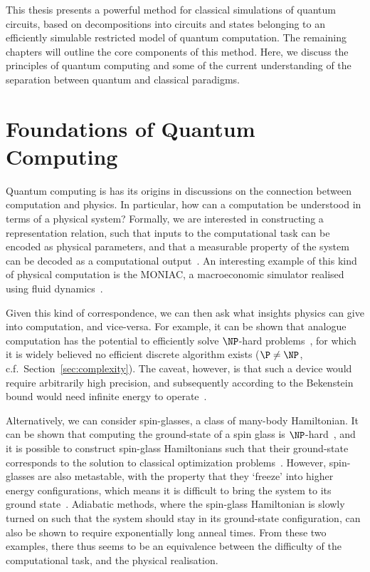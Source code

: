 This thesis presents a powerful method for classical simulations of quantum circuits, based on decompositions into circuits and states belonging to an efficiently simulable restricted model of quantum computation. The remaining chapters will outline the core components of this method. Here, we discuss the principles of quantum computing and some of the current understanding of the separation between quantum and classical paradigms.
\section{Foundations of Quantum Computing}
Quantum computing is has its origins in discussions on the connection between computation and physics. In particular, how can a computation be understood in terms of a physical system? Formally, we are interested in constructing a representation relation, such that inputs to the computational task can be encoded as physical parameters, and that a measurable property of the system can be decoded as a computational output~\cite{Horsman2014}. An interesting example of this kind of physical computation is the MONIAC, a macroeconomic simulator realised using fluid dynamics~\cite{Bissell2007}.\par
Given this kind of correspondence, we can then ask what insights physics can give into computation, and vice-versa. For example, it can be shown that analogue computation has the potential to efficiently solve $\NP$-hard problems~\cite{Schonhage1979}, for which it is widely believed no efficient discrete algorithm exists ($\P \neq \NP$, c.f.\ Section~\ref{sec:complexity}). The caveat, however, is that such a device would require arbitrarily high precision, and subsequently according to the Bekenstein bound would need infinite energy to operate~\cite{Aaronson2005}.\par
Alternatively, we can consider spin-glasses, a class of many-body Hamiltonian. It can be shown that computing the ground-state of a spin glass is $\NP$-hard~\cite{Barahona1982}, and it is possible to construct spin-glass Hamiltonians such that their ground-state corresponds to the solution to classical optimization problems~\cite{Choi2010,Lucas2014}. However, spin-glasses are also metastable, with the property that they `freeze' into higher energy configurations, which means it is difficult to bring the system to its ground state~\cite{Edwards1975}. Adiabatic methods, where the spin-glass Hamiltonian is slowly turned on such that the system should stay in its ground-state configuration, can also be shown to require exponentially long anneal times. From these two examples, there thus seems to be an equivalence between the difficulty of the computational task, and the physical realisation.\par
